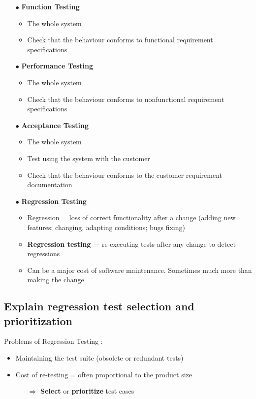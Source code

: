 \documentclass{article}
\begin{document}
\begin{multicols}{2}
\begin{itemize}
    \item [$\bullet$]\textbf{Function Testing}
    \begin{itemize}
        \item The whole system 
        \item Check that the behaviour conforms to functional requirement specifications
    \end{itemize}
    \item [$\bullet$]\textbf{Performance Testing}
    \begin{itemize}
        \item The whole system 
        \item Check that the behaviour conforms to nonfunctional requirement specifications
    \end{itemize}
    \item [$\bullet$]\textbf{Acceptance Testing}
    \begin{itemize}
        \item The whole system 
        \item Test using the system with the customer
        \item Check that the behaviour conforms to the customer requirement documentation
    \end{itemize}
    \item [$\bullet$]\textbf{Regression Testing}
    \begin{itemize}
        \item Regression =
loss
of
correct
functionality
after
a
change (adding new features; changing, adapting conditions; bugs fixing)
        \item \textbf{Regression
testing =}
re‐executing
tests
after
any
change
to
detect
regressions
        \item Can
be
a
major
cost
of
software
maintenance.
Sometimes
much
more
than
making
the
change
    \end{itemize}
\end{itemize}
\vfill\null
\end{multicols}


\subsection{Explain regression test selection and prioritization}
\noindent Problems of Regression Testing :
\begin{itemize}
    \item Maintaining the test suite (obsolete or redundant tests)
    \item Cost of re-testing = often proportional to the product size
    \begin{itemize}
         \item [$\Rightarrow$]\textbf{Select} or \textbf{prioritize} test cases
    \end{itemize}
\end{itemize}
\end{document}
